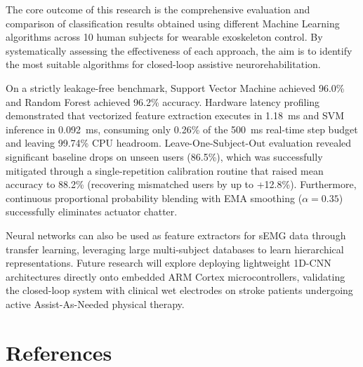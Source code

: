 \documentclass[12pt,a4paper]{article}
\begin{document}
The core outcome of this research is the comprehensive evaluation and comparison of classification results obtained using different Machine Learning algorithms across 10 human subjects for wearable exoskeleton control. By systematically assessing the effectiveness of each approach, the aim is to identify the most suitable algorithms for closed-loop assistive neurorehabilitation.

On a strictly leakage-free benchmark, Support Vector Machine achieved 96.0\% and Random Forest achieved 96.2\% accuracy. Hardware latency profiling demonstrated that vectorized feature extraction executes in 1.18~ms and SVM inference in 0.092~ms, consuming only 0.26\% of the 500~ms real-time step budget and leaving 99.74\% CPU headroom. Leave-One-Subject-Out evaluation revealed significant baseline drops on unseen users (86.5\%), which was successfully mitigated through a single-repetition calibration routine that raised mean accuracy to 88.2\% (recovering mismatched users by up to +12.8\%). Furthermore, continuous proportional probability blending with EMA smoothing ($\alpha=0.35$) successfully eliminates actuator chatter.

Neural networks can also be used as feature extractors for sEMG data through transfer learning, leveraging large multi-subject databases to learn hierarchical representations. Future research will explore deploying lightweight 1D-CNN architectures directly onto embedded ARM Cortex microcontrollers, validating the closed-loop system with clinical wet electrodes on stroke patients undergoing active Assist-As-Needed physical therapy.

\section*{References}\label{sec:references}
\end{document}
